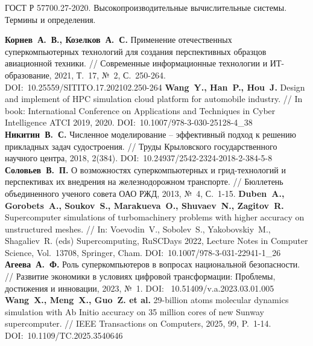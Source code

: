 \newpage
\renewcommand{\baselinestretch}{1.0}
\begin{thebibliography}{99}
\setlength{\itemsep}{0pt}


ГОСТ Р 57700.27-2020. Высокопроизводительные вычислительные системы. Термины и определения.

\textbf{Корнев~А.~В., Козелков~А.~С.} Применение отечественных суперкомпьютерных технологий для создания перспективных образцов авиационной техники. // Современные информационные технологии и ИТ-образование, 2021, Т.~17, №~2, С.~250-264. DOI:~10.25559/SITITO.17.202102.250-264
\textbf{Wang~Y., Han~P., Hou~J.} Design and implement of HPC simulation cloud platform for automobile industry. // In book: International Conference on Applications and Techniques in Cyber Intelligence ATCI 2019, 2020. DOI:~10.1007/978-3-030-25128-4\_38
\textbf{Никитин~В.~С.} Численное моделирование -- эффективный подход к решению прикладных задач судостроения. // Труды Крыловского государственного научного центра, 2018, 2(384). DOI:~10.24937/2542-2324-2018-2-384-5-8
\textbf{Соловьев~В.~П.} О возможностях суперкомпьютерных и грид-технологий и перспективах их внедрения на железнодорожном транспорте. // Бюллетень объединенного ученого совета ОАО РЖД, 2013, №~4, С.~1-15.
\textbf{Duben~A., Gorobets~A., Soukov~S., Marakueva~O., Shuvaev~N., Zagitov~R.} Supercomputer simulations of turbomachinery problems with higher accuracy on unstructured meshes. // In: Voevodin~V., Sobolev~S., Yakobovskiy~M., Shagaliev~R. (eds) Supercomputing, RuSCDays 2022, Lecture Notes in Computer Science, Vol.~13708, Springer, Cham. DOI:~10.1007/978-3-031-22941-1\_26 
\textbf{Агеева~А.~Ф.} Роль суперкомпьютеров в вопросах национальной безопасности. // Развитие экономики в условиях цифровой трансформации: Проблемы, достижения и инновации, 2023, №~1. DOI:~ 10.51409/v.a.2023.03.01.005
\textbf{Wang~X., Meng~X., Guo~Z. et al.} 29-billion atoms molecular dynamics simulation with Ab Initio accuracy on 35 million cores of new Sunway supercomputer. // IEEE Transactions on Computers, 2025, 99, P.~1-14. DOI:~10.1109/TC.2025.3540646


\end{thebibliography}
